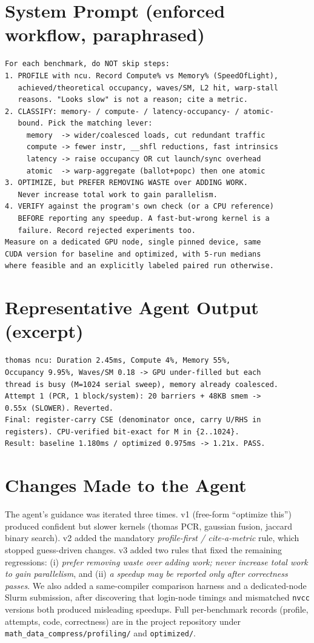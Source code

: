\documentclass[conference]{IEEEtran}
\begin{document}
\section{System Prompt (enforced workflow, paraphrased)}
\begin{lstlisting}
For each benchmark, do NOT skip steps:
1. PROFILE with ncu. Record Compute% vs Memory% (SpeedOfLight),
   achieved/theoretical occupancy, waves/SM, L2 hit, warp-stall
   reasons. "Looks slow" is not a reason; cite a metric.
2. CLASSIFY: memory- / compute- / latency-occupancy- / atomic-
   bound. Pick the matching lever:
     memory  -> wider/coalesced loads, cut redundant traffic
     compute -> fewer instr, __shfl reductions, fast intrinsics
     latency -> raise occupancy OR cut launch/sync overhead
     atomic  -> warp-aggregate (ballot+popc) then one atomic
3. OPTIMIZE, but PREFER REMOVING WASTE over ADDING WORK.
   Never increase total work to gain parallelism.
4. VERIFY against the program's own check (or a CPU reference)
   BEFORE reporting any speedup. A fast-but-wrong kernel is a
   failure. Record rejected experiments too.
Measure on a dedicated GPU node, single pinned device, same
CUDA version for baseline and optimized, with 5-run medians
where feasible and an explicitly labeled paired run otherwise.
\end{lstlisting}

\section{Representative Agent Output (excerpt)}
\begin{lstlisting}
thomas ncu: Duration 2.45ms, Compute 4%, Memory 55%,
Occupancy 9.95%, Waves/SM 0.18 -> GPU under-filled but each
thread is busy (M=1024 serial sweep), memory already coalesced.
Attempt 1 (PCR, 1 block/system): 20 barriers + 48KB smem ->
0.55x (SLOWER). Reverted.
Final: register-carry CSE (denominator once, carry U/RHS in
registers). CPU-verified bit-exact for M in {2..1024}.
Result: baseline 1.180ms / optimized 0.975ms -> 1.21x. PASS.
\end{lstlisting}

\section{Changes Made to the Agent}
The agent's guidance was iterated three times. v1 (free-form ``optimize this'')
produced confident but slower kernels (thomas PCR, gaussian fusion, jaccard
binary search). v2 added the mandatory \emph{profile-first / cite-a-metric} rule,
which stopped guess-driven changes. v3 added two rules that fixed the remaining
regressions: (i) \emph{prefer removing waste over adding work; never increase
total work to gain parallelism}, and (ii) \emph{a speedup may be reported only
after correctness passes}. We also added a same-compiler comparison harness and a
dedicated-node Slurm submission, after discovering that login-node timings and
mismatched \texttt{nvcc} versions both produced misleading speedups. Full
per-benchmark records (profile, attempts, code, correctness) are in the project
repository under \texttt{math\_data\_compress/profiling/} and
\texttt{optimized/}.
\end{document}
